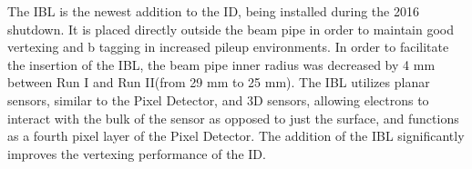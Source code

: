 \indent The IBL is the newest addition to the ID, being installed during the 2016 shutdown. It is placed directly outside the beam pipe in order to maintain good vertexing and b tagging in increased pileup environments. In order to facilitate the insertion of the IBL, the beam pipe inner radius was decreased by 4 mm between Run I and Run II(from 29 mm to 25 mm). The IBL utilizes planar sensors, similar to the Pixel Detector, and 3D sensors, allowing electrons to interact with the bulk of the sensor as opposed to just the surface, and functions as a fourth pixel layer of the Pixel Detector. The addition of the IBL significantly improves the vertexing performance of the ID.



